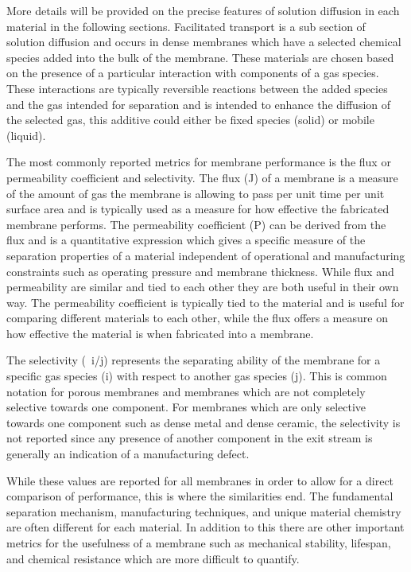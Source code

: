 More details will be provided on the precise features of solution diffusion in each material in the following 
sections. Facilitated transport is a sub section of solution diffusion and occurs in dense membranes which 
have a selected chemical species added into the bulk of the membrane. These materials are chosen based on the 
presence of a particular interaction with components of a gas species. These interactions are typically 
reversible reactions between the added species and the gas intended for separation and is intended to enhance 
the diffusion of the selected gas, this additive could either be fixed species (solid) or mobile (liquid). 

The most commonly reported metrics for membrane performance is the flux or permeability coefficient and 
selectivity. The flux (J) of a membrane is a measure of the amount of gas the membrane is allowing to pass 
per unit time per unit surface area and is typically used as a measure for how effective the fabricated 
membrane performs. The permeability coefficient (P) can be derived from the flux and is a quantitative 
expression which gives a specific measure of the separation properties of a material independent of 
operational and manufacturing constraints such as operating pressure and membrane thickness. 
While flux and permeability are similar and tied to each other they are both useful in their own way. 
The permeability coefficient is typically tied to the material and is useful for comparing different 
materials to each other, while the flux offers a measure on how effective the material is when fabricated 
into a membrane. 

The selectivity (\textalpha \ i/j) represents the separating ability of the membrane for a specific gas species 
(i) with respect to another gas species (j). This is common notation for porous membranes and membranes which 
are not completely selective towards one component. For membranes which are only selective towards one 
component such as dense metal and dense ceramic, the selectivity is not reported since any presence of 
another component in the exit stream is generally an indication of a manufacturing defect. 

While these values are reported for all membranes in order to allow for a direct comparison of 
performance, this is where the similarities end. The fundamental separation mechanism, manufacturing 
techniques, and unique material chemistry are often different for each material. In addition to this 
there are other important metrics for the usefulness of a membrane such as mechanical stability, lifespan, 
and chemical resistance which are more difficult to quantify. 


